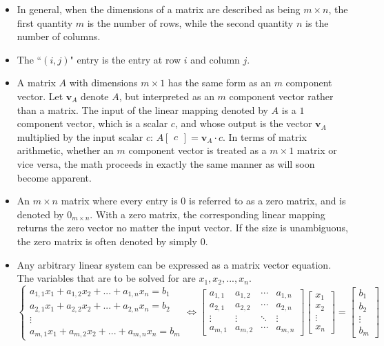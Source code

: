 \documentclass{article}
\begin{document}
\begin{itemize}
\item In general, when the dimensions of a matrix are described as being \(m \times n\), the first quantity \(m\) is the number of rows, while the second quantity \(n\) is the number of columns. 
\item The ``\((i, j)\)" entry is the entry at row \(i\) and column \(j\).
\item A matrix \(A\) with dimensions \(m \times 1\) has the same form as an \(m\) component vector. Let \(\mathbf{v}_A\) denote \(A\), but interpreted as an \(m\) component vector rather than a matrix. The input of the linear mapping denoted by \(A\) is a \(1\) component vector, which is a scalar \(c\), and whose output is the vector \(\mathbf{v}_A\) multiplied by the input scalar \(c\): \(A\begin{bmatrix} c \end{bmatrix} = \mathbf{v}_A \cdot c\). In terms of matrix arithmetic, whether an \(m\) component vector is treated as a \(m \times 1\) matrix or vice versa, the math proceeds in exactly the same manner as will soon become apparent.
\item An \(m \times n\) matrix where every entry is \(0\) is referred to as a zero matrix, and is denoted by \(0_{m \times n}\). With a zero matrix, the corresponding linear mapping returns the zero vector no matter the input vector. If the size is unambiguous, the zero matrix is often denoted by simply \(0\). 
\item Any arbitrary linear system can be expressed as a matrix vector equation. The variables that are to be solved for are \(x_1, x_2, ..., x_n\).
\[\left\{\begin{array}{c}
a_{1,1} x_1 + a_{1,2} x_2 + ... + a_{1,n} x_n = b_1 \\ 
a_{2,1} x_1 + a_{2,2} x_2 + ... + a_{2,n} x_n = b_2 \\ 
\vdots \\ 
a_{m,1} x_1 + a_{m,2} x_2 + ... + a_{m,n} x_n = b_m
\end{array}\right. \iff \begin{bmatrix}
a_{1,1} & a_{1,2} & \cdots & a_{1,n} \\
a_{2,1} & a_{2,2} & \cdots & a_{2,n} \\ 
\vdots & \vdots & \ddots & \vdots \\ 
a_{m,1} & a_{m,2} & \cdots & a_{m,n}
\end{bmatrix}\begin{bmatrix}
x_1 \\ x_2 \\ \vdots \\ x_n 
\end{bmatrix} = \begin{bmatrix} 
b_1 \\ b_2 \\ \vdots \\ b_m 
\end{bmatrix}\]
\end{itemize}
\end{document}
